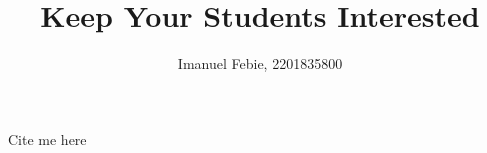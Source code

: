 \documentclass[12pt]{article}
\begin{document}
\title{Keep Your Students Interested}
\author{Imanuel Febie, 2201835800}
\maketitle





Cite me here \cite{bajak2014lectures}




\end{document}
